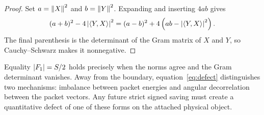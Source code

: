 \begin{proof}
Set $a=\left\lVert X\right\rVert^2$ and $b=\left\lVert Y\right\rVert^2$.  Expanding and inserting $4ab$ gives
\[
 (a+b)^2-4\left\lvert \left\langle Y,X\right\rangle\right\rvert^2
 =(a-b)^2+4\left(ab-\left\lvert \left\langle Y,X\right\rangle\right\rvert^2\right).
\]
The final parenthesis is the determinant of the Gram matrix of $X$ and $Y$,
so Cauchy--Schwarz makes it nonnegative.
\end{proof}

Equality $\left\lvert F_1\right\rvert=S/2$ holds precisely when the norms agree and the Gram
determinant vanishes.  Away from the boundary, equation~\eqref{eq:defect}
distinguishes two mechanisms: imbalance between packet energies and angular
decorrelation between the packet vectors.  Any future strict signed saving
must create a quantitative defect of one of these forms on the attached
physical object.
